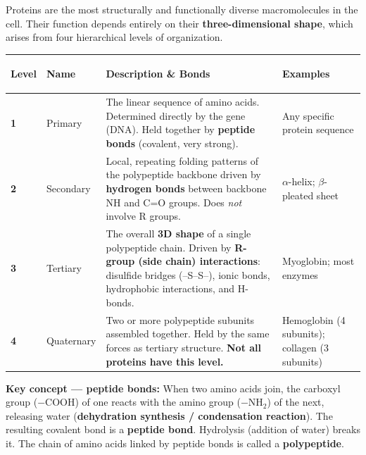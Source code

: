 \documentclass[11pt, letterpaper]{article}
\begin{document}
Proteins are the most structurally and functionally diverse macromolecules in the cell.
Their function depends entirely on their \textbf{three-dimensional shape}, which arises
from four hierarchical levels of organization.

\noindent
{\renewcommand{\arraystretch}{1.6}
\begin{tabularx}{\textwidth}{>{\bfseries\centering\arraybackslash}p{1cm}
                              >{\bfseries\raggedright\arraybackslash}p{3cm}
                              >{\raggedright\arraybackslash}X
                              >{\raggedright\arraybackslash}p{3.2cm}}
\toprule
\rowcolor{tableheader}
\textbf{Level} & \textbf{Name} & \textbf{Description \& Bonds} & \textbf{Examples} \\
\midrule
\rowcolor{rowA} 1 & Primary & The linear sequence of amino acids. Determined directly by the gene (DNA). Held together by \textbf{peptide bonds} (covalent, very strong). & Any specific protein sequence \\
\rowcolor{rowB} 2 & Secondary & Local, repeating folding patterns of the polypeptide backbone driven by \textbf{hydrogen bonds} between backbone NH and C=O groups. Does \emph{not} involve R groups. & $\alpha$-helix; $\beta$-pleated sheet \\
\rowcolor{rowA} 3 & Tertiary & The overall \textbf{3D shape} of a single polypeptide chain. Driven by \textbf{R-group (side chain) interactions}: disulfide bridges (--S--S--), ionic bonds, hydrophobic interactions, and H-bonds. & Myoglobin; most enzymes \\
\rowcolor{rowB} 4 & Quaternary & Two or more polypeptide subunits assembled together. Held by the same forces as tertiary structure. \textbf{Not all proteins have this level.} & Hemoglobin (4 subunits); collagen (3 subunits) \\
\bottomrule
\end{tabularx}}

\vspace{4pt}
\begin{tcolorbox}[colback=craapbg, colframe=craapborder, arc=3pt, boxrule=1pt]
\textbf{Key concept --- peptide bonds:} When two amino acids join, the carboxyl group
($-$COOH) of one reacts with the amino group ($-$NH$_2$) of the next, releasing water
(\textbf{dehydration synthesis / condensation reaction}). The resulting covalent bond is a
\textbf{peptide bond}. Hydrolysis (addition of water) breaks it. The chain of amino acids
linked by peptide bonds is called a \textbf{polypeptide}.
\end{tcolorbox}
\end{document}
